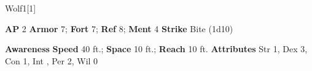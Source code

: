 \begin{monsection}{Wolf}{1}[1]
\vspace{-1em}\vspace{-1em}
\begin{spellcontent}
\begin{spelltargetinginfo}
{\textbf{AP} 2}
\pari \textbf{Armor} 7;
\textbf{Fort} 7;
\textbf{Ref} 8;
\textbf{Ment} 4
\pari \textbf{Strike} Bite  (1d10)
\end{spelltargetinginfo}
\end{spellcontent}
\begin{spellsubcontent}
\begin{spellfooter}
\pari \textbf{Awareness} 
\pari \textbf{Speed} 40 ft.;
\textbf{Space} 10 ft.;
\textbf{Reach} 10 ft.
\pari \textbf{Attributes}
Str 1,
Dex 3,
Con 1,
Int ,
Per 2,
Wil 0
\end{spellfooter}
\end{spellsubcontent}
\end{monsection}
